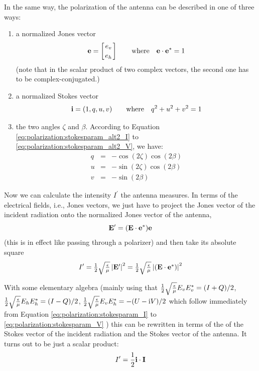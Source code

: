 In the same way, the polarization of the antenna can be described in
one of three ways:
\begin{enumerate}
\item a normalized Jones vector
\begin{equation}
\mathbf{e}= \left[e_v \atop e_h\right]\qquad
   \mbox{where}\quad \mathbf{e}\cdot\mathbf{e}^\ast = 1
 \end{equation}
(note  that in the scalar product of two complex vectors, the second one
has to be complex-conjugated.)

\item a normalized Stokes vector 
\begin{equation}
\mathbf{i} = (1, q, u, v)\qquad
   \mbox{where}\quad q^2+u^2+v^2=1
 \end{equation}
 
\item the
  two angles $\zeta$ and $\beta$.  According to
  Equation \ref{eq:polarization:stokesparam_alt2_I}
  to \ref{eq:polarization:stokesparam_alt2_V}, we have:
\begin{eqnarray}
  \label{eq:polarization:antenna-q}
 q &=&  - \cos(2\zeta)\cos(2\beta)\\ 
  \label{eq:polarization:antenna-u}
 u &=& - \sin(2\zeta)\cos(2\beta)\\
  \label{eq:polarization:antenna-v}
 v &=& - \sin(2\beta)
\end{eqnarray}
\end{enumerate}

Now we can calculate the intensity $I^\prime$ 
the antenna measures. In terms of the electrical fields, 
i.e., Jones vectors,  we just have to
project the Jones vector  of the incident radiation onto the
normalized Jones vector  of the antenna,
\begin{equation}
  \label{eq:polarization:antenna-projection}
   \mathbf{E}^\prime =  (\mathbf{E}\cdot\mathbf{e}^\ast) \mathbf{e}
\end{equation}
(this is in effect like passing through a polarizer) and then take its
absolute square
\begin{equation}
  \label{eq:polarization:antenna:intensity-jones}
  I^\prime =  \textstyle\frac{1}{2}\sqrt{\textstyle{\frac{\epsilon}{\mu}}}\left| \mathbf{E}^{\prime} \right| ^2 
   = \textstyle\frac{1}{2}\sqrt{\textstyle{\frac{\epsilon}{\mu}}}\left|(\mathbf{E}\cdot\mathbf{e}^\ast) \right| ^2 
\end{equation}

With some elementary algebra (mainly using that $\textstyle\frac{1}{2}\sqrt{\textstyle{\frac{\epsilon}{\mu}}} E_v
E_v^\ast = (I+Q)/2$, $\textstyle\frac{1}{2}\sqrt{\textstyle{\frac{\epsilon}{\mu}}} E_h E_h^\ast = (I-Q)/2$,
$\textstyle\frac{1}{2}\sqrt{\textstyle{\frac{\epsilon}{\mu}}} E_v E_h^\ast = -(U - \mathrm{i} V)/2$ which follow immediately
from Equation \ref{eq:polarization:stokesparam_I}
to \ref{eq:polarization:stokesparam_V} ) this can be rewritten in
terms of the of the Stokes vector  of the incident radiation
and the Stokes vector  of the antenna.  It turns out to be
just a scalar product:
\begin{equation}
  \label{eq:polarization:antenna:intensity-stokes}
  I^\prime = \frac{1}{2}\mathbf{i}\cdot\mathbf{I}
\end{equation}

